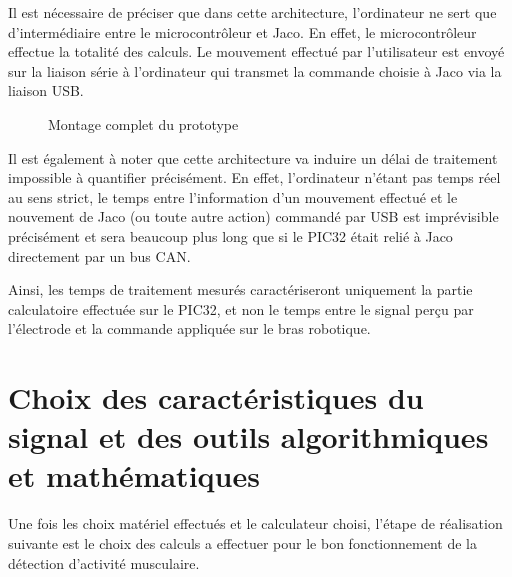 \documentclass[letterpaper, twoside, 12pt, memoire, creativecommons, hyperref]{thETS}
\begin{document}
Il est nécessaire de préciser que dans cette architecture, l'ordinateur ne sert que d'intermédiaire entre le microcontrôleur et Jaco. En effet, le microcontrôleur effectue la totalité des calculs. Le mouvement effectué par l'utilisateur est envoyé sur la liaison série à l'ordinateur qui transmet la commande choisie à Jaco via la liaison USB. 

\begin{figure}
	\centering
	\caption{Montage complet du prototype}
	\label{fig:archiMatMont}
\end{figure}

Il est également à noter que cette architecture va induire un délai de traitement impossible à quantifier précisément. En effet, l'ordinateur n'étant pas temps réel au sens strict, le temps entre l'information d'un mouvement effectué et le nouvement de Jaco (ou toute autre action) commandé par USB est imprévisible précisément et sera beaucoup plus long que si le PIC32 était relié à Jaco directement par un bus CAN. 

Ainsi, les temps de traitement mesurés caractériseront uniquement la partie calculatoire effectuée sur le PIC32, et non le temps entre le signal perçu par l'électrode et la commande appliquée sur le bras robotique.

\section{Choix des caractéristiques du signal et des outils algorithmiques et mathématiques}

Une fois les choix matériel effectués et le calculateur choisi, l'étape de réalisation suivante est le choix des calculs a effectuer pour le bon fonctionnement de la détection d'activité musculaire. 
\end{document}
